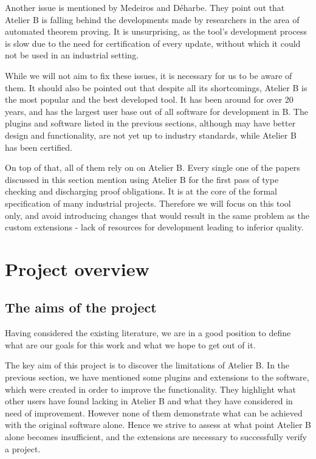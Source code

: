 \documentclass[12pt,journal,duplex]{IEEEtran}
\begin{document}
	Another issue is mentioned by Medeiros and D\'{e}harbe\cite{BEval}. They point out that Atelier B is falling behind the developments made by researchers in the area of automated theorem proving. It is unsurprising, as the tool's development process is slow due to the need for certification of every update, without which it could not be used in an industrial setting.

	While we will not aim to fix these issues, it is necessary for us to be aware of them. It should also be pointed out that despite all its shortcomings, Atelier B is the most popular and the best developed tool. It has been around for over 20 years, and has the largest user base out of all software for development in B. The plugins and software listed in the previous sections, although may have better design and functionality, are not yet up to industry standards, while Atelier B has been certified.

	On top of that, all of them rely on on Atelier B. Every single one of the papers discussed in this section mention using Atelier B for the first pass of type checking and discharging proof obligations. It is at the core of the formal specification of many industrial projects. Therefore we will focus on this tool only, and avoid introducing changes that would result in the same problem as the custom extensions - lack of resources for development leading to inferior quality.

	\section{Project overview}
	\subsection{The aims of the project}
	Having considered the existing literature, we are in a good position to define what are our goals for this work and what we hope to get out of it.

	The key aim of this project is to discover the limitations of Atelier B. In the previous section, we have mentioned some plugins and extensions to the software, which were created in order to improve the functionality. They highlight what other users have found lacking in Atelier B and what they have considered in need of improvement. However none of them demonstrate what can be achieved with the original software alone. Hence we strive to assess at what point Atelier B alone becomes insufficient, and the extensions are necessary to successfully verify a project.
\end{document}
